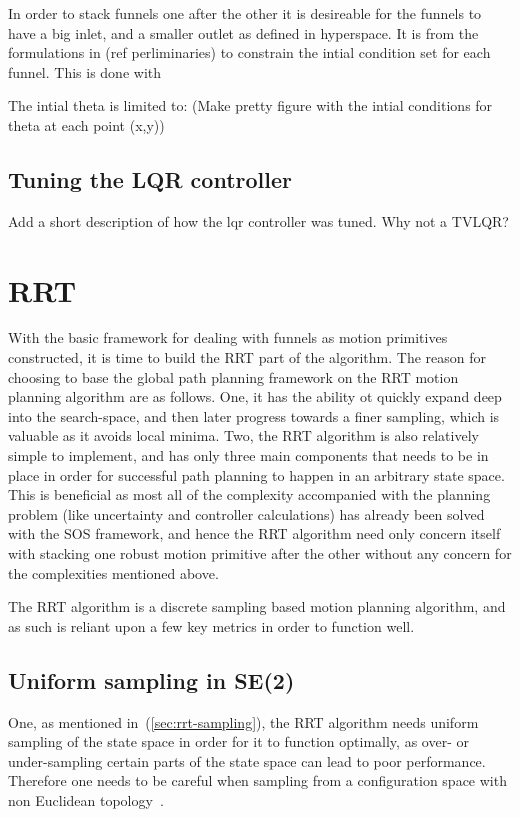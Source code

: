 In order to stack funnels one after the other it is desireable for the funnels
to have a big inlet, and a smaller outlet as defined in hyperspace. It is from
the formulations in (ref perliminaries) to constrain the intial condition set
for each funnel. This is done with

The intial theta is limited to: (Make pretty figure with the intial conditions
for theta at each point (x,y))

\subsection{Tuning the LQR controller}

Add a short description of how the lqr controller was tuned. Why not a TVLQR?

\section{RRT}

With the basic framework for dealing with funnels as motion primitives
constructed, it is time to build the \ac{RRT} part of the \rrtfunnel{}
algorithm. The reason for choosing to base the global path planning framework on
the \ac{RRT} motion planning algorithm are as follows. One, it has the ability
ot quickly expand deep into the search-space, and then later progress towards a
finer sampling, which is valuable as it avoids local minima. Two, the \ac{RRT}
algorithm is also relatively simple to implement, and has only three main
components that needs to be in place in order for successful path planning to
happen in an arbitrary state space. This is beneficial as most all of the
complexity accompanied with the planning problem (like uncertainty and
controller calculations) has already been solved with the \ac{SOS} framework,
and hence the \ac{RRT} algorithm need only concern itself with stacking one
robust motion primitive after the other without any concern for the complexities
mentioned above.

The \ac{RRT} algorithm is a discrete sampling based motion planning algorithm,
and as such is reliant upon a few key metrics in order to function well.

\subsection{Uniform sampling in SE(2)}

One, as mentioned in~(\ref{sec:rrt-sampling}), the \ac{RRT} algorithm needs
uniform sampling of the state space in order for it to function optimally, as
over- or under-sampling certain parts of the state space can lead to poor
performance. Therefore one needs to be careful when sampling from a
configuration space with non Euclidean
topology~\cite{kuffnerEffectiveSamplingDistance2004}.

